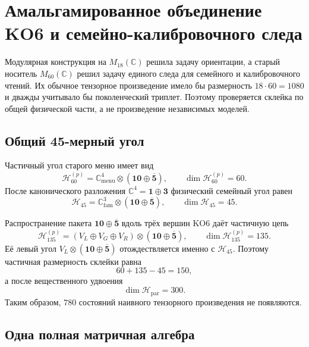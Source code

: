 \chapter{Амальгамированное объединение KO6 и семейно-калибровочного следа}

Модулярная конструкция на \(M_{18}(\mathbb C)\) решила задачу ориентации,
а старый носитель \(M_{60}(\mathbb C)\) решил задачу единого следа для
семейного и калибровочного чтений. Их обычное тензорное произведение имело
бы размерность \(18\cdot60=1080\) и дважды учитывало бы поколенческий
триплет. Поэтому проверяется склейка по общей физической части, а не
произведение независимых моделей.

\section{Общий 45-мерный угол}

Частичный угол старого меню имеет вид
\begin{equation}
 \mathcal H_{60}^{(p)}
 =\mathbb C^4_{\mathrm{menu}}\otimes
 (\mathbf{10}\oplus\overline{\mathbf5}),
 \qquad \dim\mathcal H_{60}^{(p)}=60.
\end{equation}
После канонического разложения \(\mathbb C^4=\mathbf1\oplus\mathbf3\)
физический семейный угол равен
\begin{equation}
 \mathcal H_{45}
 =\mathbb C^3_{\mathrm{fam}}\otimes
 (\mathbf{10}\oplus\overline{\mathbf5}),
 \qquad \dim\mathcal H_{45}=45.
\end{equation}

Распространение пакета \(\mathbf{10}\oplus\overline{\mathbf5}\) вдоль
трёх вершин KO6 даёт частичную цепь
\begin{equation}
 \mathcal H_{135}^{(p)}
 =(V_L\oplus V_G\oplus V_R)
 \otimes(\mathbf{10}\oplus\overline{\mathbf5}),
 \qquad \dim\mathcal H_{135}^{(p)}=135.
\end{equation}
Её левый угол \(V_L\otimes(\mathbf{10}\oplus\overline{\mathbf5})\)
отождествляется именно с \(\mathcal H_{45}\). Поэтому частичная размерность
склейки равна
\begin{equation}
 60+135-45=150,
\end{equation}
а после вещественного удвоения
\begin{equation}
 \dim\mathcal H_{\mathrm{par}}=300.
 \label{eq:v5-m300-dimension}
\end{equation}
Таким образом, \(780\) состояний наивного тензорного произведения не
появляются.

\section{Одна полная матричная алгебра}

